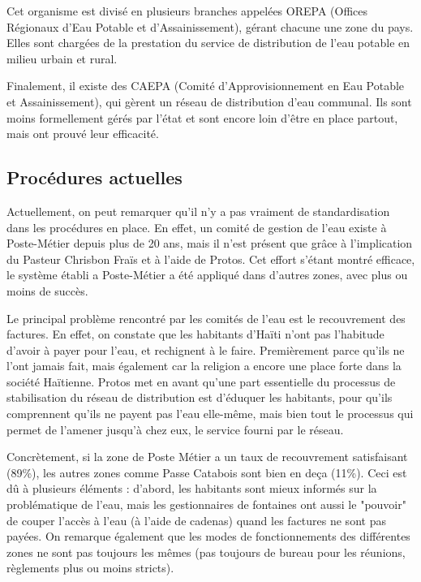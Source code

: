 \documentclass{eplmastersthesis_FR}
\begin{document}
			Cet organisme est divisé en plusieurs branches appelées OREPA (Offices Régionaux d'Eau Potable et d'Assainissement), gérant chacune une zone du pays. Elles sont chargées de la prestation du service de distribution de l'eau potable en milieu urbain et rural.

			Finalement, il existe des CAEPA (Comité d’Approvisionnement en Eau Potable et Assainissement), qui gèrent un réseau de distribution d'eau communal. Ils sont moins formellement gérés par l'état et sont encore loin d'être en place partout, mais ont prouvé leur efficacité.



			\subsection*{Procédures actuelles}
			Actuellement, on peut remarquer qu'il n'y a pas vraiment de standardisation dans les procédures en place. En effet, un comité de gestion de l'eau existe à Poste-Métier depuis plus de 20 ans, mais il n'est présent que grâce à l'implication du Pasteur Chrisbon Fraïs et à l'aide de Protos. Cet effort s'étant montré efficace, le système établi a Poste-Métier a été appliqué dans d'autres zones, avec plus ou moins de succès.

			Le principal problème rencontré par les comités de l'eau est le recouvrement des factures. En effet, on constate que les habitants d'Haïti n'ont pas l'habitude d'avoir à payer pour l'eau, et rechignent à le faire. Premièrement parce qu'ils ne l'ont jamais fait, mais également car la religion a encore une place forte dans la société Haïtienne. Protos met en avant qu'une part essentielle du processus de stabilisation du réseau de distribution est d'éduquer les habitants, pour qu'ils comprennent qu'ils ne payent pas l'eau elle-même, mais bien tout le processus qui permet de l'amener jusqu'à chez eux, le service fourni par le réseau.

			Concrètement, si la zone de Poste Métier a un taux de recouvrement satisfaisant (89\%), les autres zones comme Passe Catabois sont bien en deça (11\%). Ceci est dû à plusieurs éléments : d'abord, les habitants sont mieux informés sur la problématique de l'eau, mais les gestionnaires de fontaines ont aussi le "pouvoir" de couper l'accès à l'eau (à l'aide de cadenas) quand les factures ne sont pas payées. On remarque également que les modes de fonctionnements des différentes zones ne sont pas toujours les mêmes (pas toujours de bureau pour les réunions, règlements plus ou moins stricts).
\end{document}
